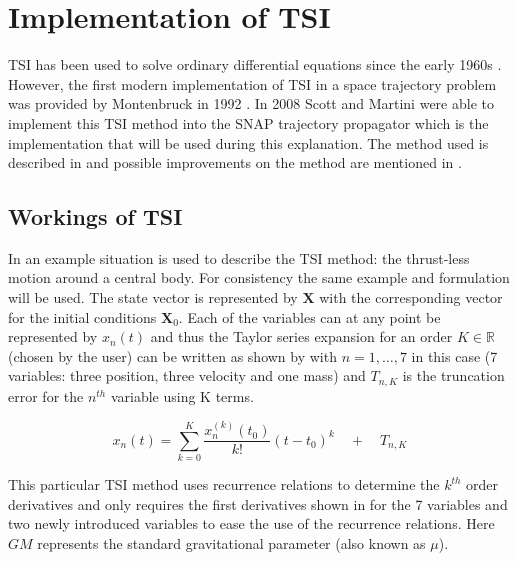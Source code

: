 
\section{Implementation of \ac{TSI}}
\label{sec:imptsi}
\ac{TSI} has been used to solve ordinary differential equations since the early 1960s \cite{scott2008high}. However, the first modern implementation of \ac{TSI} in a space trajectory problem was provided by Montenbruck in 1992 \cite{montenbruck1992numerical,scott2010high}. In 2008 Scott and Martini were able to implement this \ac{TSI} method into the SNAP trajectory propagator \cite{scott2008high} which is the implementation that will be used during this explanation. The method used is described in  and possible improvements on the method are mentioned in . 

\subsection{Workings of \ac{TSI}}
\label{subsec:worktsi}
In \cite{scott2008high} an example situation is used to describe the \ac{TSI} method: the thrust-less motion around a central body. For consistency the same example and formulation will be used. The state vector is represented by $\mathbf{X}$ with the corresponding vector for the initial conditions $\mathbf{X}_{0}$. Each of the variables can at any point be represented by $x_{n}\left(t\right)$ and thus the Taylor series expansion for an order $K \in \mathbb{R}$ (chosen by the user) can be written as shown by  with $n=1,\dots,7$ in this case (7 variables: three position, three velocity and one mass) and $T_{n,K}$ is the truncation error for the $n^{th}$ variable using K terms. 



\begin{equation} \label{eq:general_taylor}
x_{n}\left(t\right)=\displaystyle\sum_{k=0}^{K}\dfrac{x_{n}^{\left(k\right)}\left(t_{0}\right)}{k!}\left(t-t_{0}\right)^{k} \quad + \quad	T_{n,K}
\end{equation}

This particular \ac{TSI} method uses recurrence relations to determine the $k^{th}$ order derivatives and only requires the first derivatives shown in  for the 7 variables and two newly introduced variables to ease the use of the recurrence relations. Here $GM$ represents the standard gravitational parameter (also known as $\mu$).

